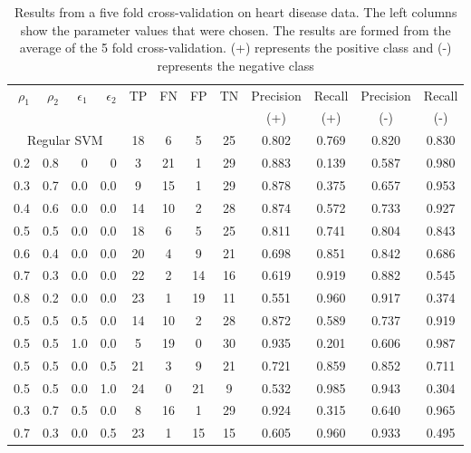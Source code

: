 \documentclass[twoside,11pt]{article}
\begin{document}
          

\begin{table}[htbp]\label{table:HeartDisease1}
  \centering
    \begin{tabular}{rrrr|cccccccc}
    \hline
    \multirow{2}{*}{$\rho_1$} & \multirow{2}{*}{$\rho_2$} & \multirow{2}{*}{$\epsilon_1$} & \multirow{2}{*}{$\epsilon_2$} & \multirow{2}{*}{TP}    & \multirow{2}{*}{FN}    & \multirow{2}{*}{FP}    & \multirow{2}{*}{TN} & Precision & Recall & Precision & Recall\\
    &&&&&&&&  (+) &  (+) &  (-) &  (-) \bigstrut\\
    \hline
    \hline
   \multicolumn{4}{c|}{Regular SVM} & 18    & 6     & 5     & 25    & 0.802 & 0.769 & 0.820 & 0.830 \bigstrut[t]\\
    0.2   & 0.8   & 0     & 0     & 3     & 21    & 1     & 29    & 0.883 & 0.139 & 0.587 & 0.980 \bigstrut[t]\\
    0.3   & 0.7   & 0.0   & 0.0   & 9     & 15    & 1     & 29    & 0.878 & 0.375 & 0.657 & 0.953 \\
    0.4   & 0.6   & 0.0   & 0.0   & 14    & 10    & 2     & 28    & 0.874 & 0.572 & 0.733 & 0.927 \\
    0.5   & 0.5   & 0.0   & 0.0   & 18    & 6     & 5     & 25    & 0.811 & 0.741 & 0.804 & 0.843 \\
    0.6   & 0.4   & 0.0   & 0.0   & 20    & 4     & 9     & 21    & 0.698 & 0.851 & 0.842 & 0.686 \\
    0.7   & 0.3   & 0.0   & 0.0   & 22    & 2     & 14    & 16    & 0.619 & 0.919 & 0.882 & 0.545 \\
    0.8   & 0.2   & 0.0   & 0.0   & 23    & 1     & 19    & 11    & 0.551 & 0.960 & 0.917 & 0.374 \\
    0.5   & 0.5   & 0.5   & 0.0   & 14    & 10    & 2     & 28    & 0.872 & 0.589 & 0.737 & 0.919 \\
    0.5   & 0.5   & 1.0   & 0.0   & 5     & 19    & 0     & 30    & 0.935 & 0.201 & 0.606 & 0.987 \\
    0.5   & 0.5   & 0.0   & 0.5   & 21    & 3     & 9     & 21    & 0.721 & 0.859 & 0.852 & 0.711 \\
    0.5   & 0.5   & 0.0   & 1.0   & 24    & 0     & 21    & 9     & 0.532 & 0.985 & 0.943 & 0.304 \\
    0.3   & 0.7   & 0.5   & 0.0   & 8     & 16    & 1     & 29    & 0.924 & 0.315 & 0.640 & 0.965 \\
    0.7   & 0.3   & 0.0   & 0.5   & 23    & 1     & 15    & 15    & 0.605 & 0.960 & 0.933 & 0.495 \bigstrut[b]\\
    \hline
    \hline
    \end{tabular}%
    \caption{Results from a five fold cross-validation on heart disease data. The left columns show the parameter values that were chosen. The results are formed from the average of the 5 fold cross-validation. (+) represents the positive class and (-) represents the negative class}
\end{table}%
\end{document}
